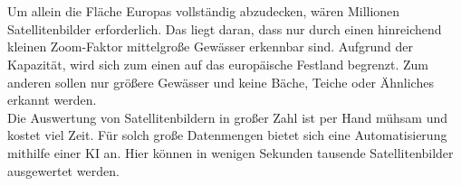 %
\\
\\
Um allein die Fläche Europas vollständig abzudecken, wären Millionen Satellitenbilder erforderlich.
Das liegt daran, dass nur durch einen hinreichend kleinen Zoom-Faktor mittelgroße Gewässer erkennbar sind.
Aufgrund der Kapazität, wird sich zum einen auf das europäische Festland begrenzt.
Zum anderen sollen nur größere Gewässer und keine Bäche, Teiche oder Ähnliches erkannt werden.
\\
Die Auswertung von Satellitenbildern in großer Zahl ist per Hand mühsam und kostet viel Zeit.
Für solch große Datenmengen bietet sich eine Automatisierung mithilfe einer KI an.
Hier können in wenigen Sekunden tausende Satellitenbilder ausgewertet werden.